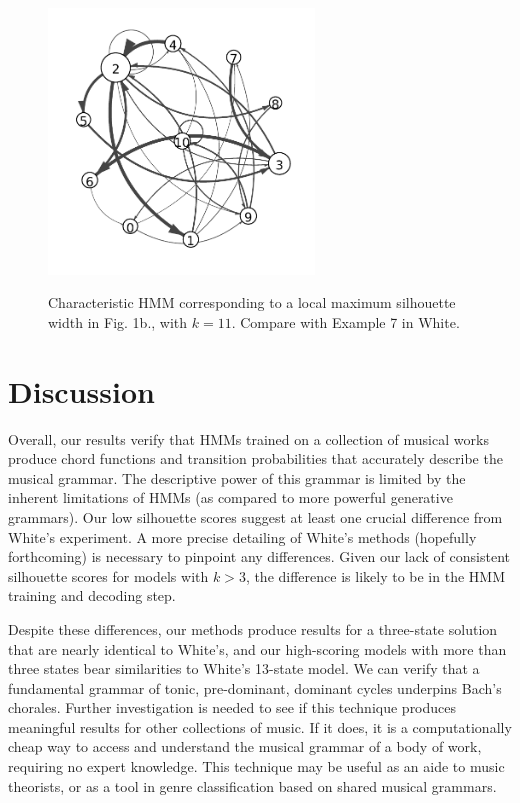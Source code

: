 \documentclass[letterpaper]{article}
\begin{document}
\begin{figure}
\vspace{-25pt}
    \centering
\includegraphics[width=200pt]{1215111126-model-11.pdf}
    \label{fig:first_sub}
    \caption{Characteristic HMM corresponding to a local maximum silhouette width in Fig. 1b., with $k=11$. Compare with Example 7 in White.}
    \label{fig:sample_figure_3}
\vspace{-10pt}
\end{figure}

\section{Discussion}
Overall, our results verify that HMMs trained on a collection of musical works produce chord functions and transition probabilities that accurately describe the musical grammar. The descriptive power of this grammar is limited by the inherent limitations of HMMs (as compared to more powerful generative grammars). Our low silhouette scores suggest at least one crucial difference from White's experiment. A more precise detailing of White's methods (hopefully forthcoming) is necessary to pinpoint any differences. Given our lack of consistent silhouette scores for models with $k >3$, the difference is likely to be in the HMM training and decoding step.

Despite these differences, our methods produce results for a three-state solution that are nearly identical to White's, and our high-scoring models with more than three states bear similarities to White's 13-state model. We can verify that a fundamental grammar of tonic, pre-dominant, dominant cycles underpins Bach's chorales. Further investigation is needed to see if this technique produces meaningful results for other collections of music. If it does, it is a computationally cheap way to access and understand the musical grammar of a body of work, requiring no expert knowledge. This technique may be useful as an aide to music theorists, or as a tool in genre classification based on shared musical grammars.
\end{document}
